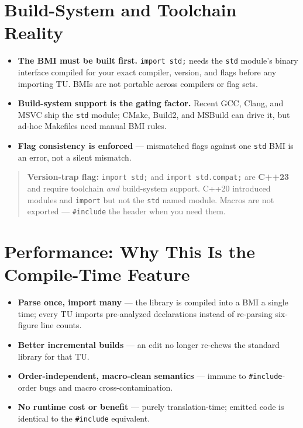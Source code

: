\section{Build-System and Toolchain Reality}

\begin{itemize}
    \item \textbf{The BMI must be built first.} \lstinline|import std;| needs the \lstinline|std| module's binary interface compiled for your exact compiler, version, and flags before any importing TU. BMIs are not portable across compilers or flag sets.
    \item \textbf{Build-system support is the gating factor.} Recent GCC, Clang, and MSVC ship the \lstinline|std| module; CMake, Build2, and MSBuild can drive it, but ad-hoc Makefiles need manual BMI rules.
    \item \textbf{Flag consistency is enforced} --- mismatched flags against one \lstinline|std| BMI is an error, not a silent mismatch.
\end{itemize}

\begin{quote}
\textbf{Version-trap flag:} \lstinline|import std;| and \lstinline|import std.compat;| are \textbf{C++23} and require toolchain \emph{and} build-system support. C++20 introduced modules and \lstinline|import| but not the \lstinline|std| named module. Macros are not exported --- \lstinline|#include| the header when you need them.
\end{quote}

\section{Performance: Why This Is the Compile-Time Feature}

\begin{itemize}
    \item \textbf{Parse once, import many} --- the library is compiled into a BMI a single time; every TU imports pre-analyzed declarations instead of re-parsing six-figure line counts.
    \item \textbf{Better incremental builds} --- an edit no longer re-chews the standard library for that TU.
    \item \textbf{Order-independent, macro-clean semantics} --- immune to \lstinline|#include|-order bugs and macro cross-contamination.
    \item \textbf{No runtime cost or benefit} --- purely translation-time; emitted code is identical to the \lstinline|#include| equivalent.
\end{itemize}

